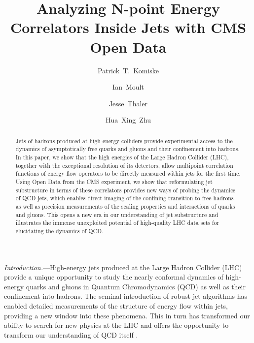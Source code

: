 \documentclass[aps,prl,twocolumn,showpacs,10pt,superscriptaddress,preprintnumbers,nofootinbib,longbibliography]{revtex4-1}
\begin{document}

\title{{\color{red}A}nalyzing {\color{red}N}-point {\color{red}E}nergy {\color{red}C}orrelator{\color{red}s} Inside Jets with CMS Open Data}


\author{Patrick~T.~Komiske}
\author{Ian~Moult}
\author{Jesse~Thaler}
\author{Hua~Xing~Zhu}

\begin{abstract}
%
Jets of hadrons produced at high-energy colliders provide experimental access to the dynamics of asymptotically free quarks and gluons and their confinement into hadrons.
%
In this paper, we show that the high energies of the Large Hadron Collider (LHC), together with the exceptional resolution of its detectors, allow multipoint correlation functions of energy flow operators to be directly measured within jets for the first time. 
%
Using Open Data from the CMS experiment, we show that reformulating jet substructure in terms of these correlators provides new ways of probing the dynamics of QCD jets, which enables direct imaging of the confining transition to free hadrons as well as precision measurements of the scaling properties and interactions of quarks and gluons.
%
This opens a new era in our understanding of jet substructure and illustrates the immense unexploited potential of high-quality LHC data sets for elucidating the dynamics of QCD.
%
\end{abstract}



\maketitle


\emph{Introduction.}---High-energy jets produced at the Large Hadron Collider (LHC) provide a unique opportunity to study the nearly conformal dynamics of high-energy quarks and gluons in Quantum Chromodynamics (QCD) as well as their confinement into hadrons.
%
The seminal introduction of robust jet algorithms \cite{Cacciari:2005hq,Cacciari:2008gp,Cacciari:2011ma} has enabled detailed measurements of the structure of energy flow within jets, providing a new window into these phenomena.
%
This in turn has transformed our ability to search for new physics at the LHC \cite{Butterworth:2008iy,Kaplan:2008ie,Krohn:2009th} and offers the opportunity to transform our understanding of QCD itself \cite{Larkoski:2017jix,Marzani:2019hun}. 
\end{document}
